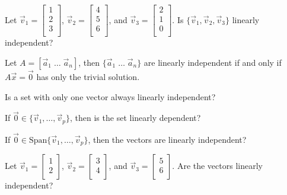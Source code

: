 \begin{enumerate}

\Problem Let $\vec{v}_1=\begin{bmatrix} 1\\2\\3\\ \end{bmatrix}$, $\vec{v}_2=\begin{bmatrix} 4\\5\\6\\ \end{bmatrix}$, and $\vec{v}_3=\begin{bmatrix} 2\\1\\0\\ \end{bmatrix}$. Is $\{ \vec{v}_1, \vec{v}_2,\vec{v}_3 \}$ linearly independent?

\vfill

\vfill

\vfill

Let $A= [\vec{a}_1 \; \dots \; \vec{a}_n ]$, then $\{ \vec{a}_1 \; \dots \; \vec{a}_n \}$ are linearly independent if and only if $A \vec{x} = \vec{0}$ has only the trivial solution.

\Problem Is a set with only one vector always linearly independent?

\vfill

\Problem If $\vec{0} \in \{ \vec{v}_1, \dots, \vec{v}_p \}$, then is the set linearly dependent?

\vfill

\Problem If $\vec{0} \in \text{Span}\{ \vec{v}_1, \dots, \vec{v}_p \}$, then the vectors are linearly independent?

\vfill

\newpage

\Problem Let $\vec{v}_1=\begin{bmatrix} 1\\2\\ \end{bmatrix}$, $\vec{v}_2=\begin{bmatrix} 3\\4\\ \end{bmatrix}$, and $\vec{v}_3=\begin{bmatrix} 5\\6\\ \end{bmatrix}$. Are the vectors linearly independent?


\end{enumerate}

